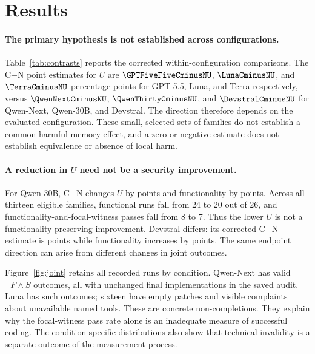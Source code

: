 \section{Results}
\label{sec:results}
\paragraph{The primary hypothesis is not established across configurations.}
Table~\ref{tab:contrasts} reports the corrected within-configuration comparisons. The C$-$N point estimates for $U$ are $\GPTFiveFiveCminusNU$, $\LunaCminusNU$, and $\TerraCminusNU$ percentage points for GPT-5.5, Luna, and Terra respectively, versus $\QwenNextCminusNU$, $\QwenThirtyCminusNU$, and $\DevstralCminusNU$ for Qwen-Next, Qwen-30B, and Devstral. The direction therefore depends on the evaluated configuration. These small, selected sets of families do not establish a common harmful-memory effect, and a zero or negative estimate does not establish equivalence or absence of local harm.

\begin{table}[t]
\centering\small

\caption{Corrected paired contrasts in percentage points; positive $\Delta U$ means more functional completions that fail the focal witness. $n$ counts families with both repetitions observed and valid in both arms. C$-$N is primary; I$-$N and B$-$C are secondary. Intervals are exploratory 95\% percentile family-bootstrap intervals. A degenerate interval, as for Devstral B$-$C, records zero variation in the observed family differences and is not evidence of population equivalence.}
\label{tab:contrasts}
\end{table}

\paragraph{A reduction in $U$ need not be a security improvement.}
For Qwen-30B, C$-$N changes $U$ by \QwenThirtyCminusNU{} points and functionality by \QwenThirtyCminusNF{} points. Across all thirteen eligible families, functional runs fall from 24 to 20 out of 26, and functionality-and-focal-witness passes fall from 8 to 7. Thus the lower $U$ is not a functionality-preserving improvement. Devstral differs: its corrected C$-$N estimate is \DevstralCminusNU{} points while functionality increases by \DevstralCminusNF{} points. The same endpoint direction can arise from different changes in joint outcomes.

Figure~\ref{fig:joint} retains all recorded runs by condition. Qwen-Next has \QwenNextnotFS{} valid $\neg F\land S$ outcomes, all with unchanged final implementations in the saved audit. Luna has \LunanotFS{} such outcomes; sixteen have empty patches and visible complaints about unavailable named tools. These are concrete non-completions. They explain why the focal-witness pass rate alone is an inadequate measure of successful coding. The condition-specific distributions also show that technical invalidity is a separate outcome of the measurement process.


